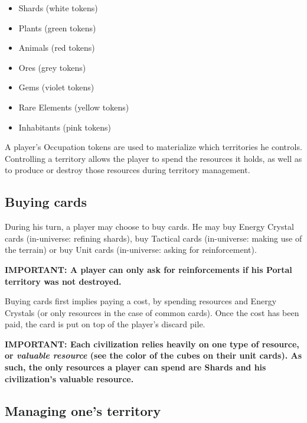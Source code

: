 \documentclass[a4paper]{article}
\begin{document}
    \vspace{-1.3em}
    \begin{itemize}
        \item Shards (white tokens)
        \item Plants (green tokens)
        \item Animals (red tokens)
        \item Ores (grey tokens)
        \item Gems (violet tokens)
        \item Rare Elements (yellow tokens)
        \item Inhabitants (pink tokens)
    \end{itemize}
    
    \vspace{-0.7em}
    A player's Occupation tokens are used to materialize which territories he controls.
    Controlling a territory allows the player to spend the resources it holds,
    as well as to produce or destroy those resources during territory management.
  
  
  \subsection{Buying cards}

    During his turn, a player may choose to buy cards.
    He may buy Energy Crystal cards (in-universe: refining shards),
    buy Tactical cards (in-universe: making use of the terrain)
    or buy Unit cards (in-universe: asking for reinforcement).
    
    \hspace{-1.5em} \textbf{IMPORTANT:
    A player can only ask for reinforcements if his Portal territory was not destroyed.
    }
    
    Buying cards first implies paying a cost, by spending resources and Energy Crystals
    (or only resources in the case of common cards).
    Once the cost has been paid, the card is put on top of the player's discard pile.
    
    \hspace{-1.5em} \textbf{IMPORTANT:
    Each civilization relies heavily on one type of resource, or
    \textit{valuable resource} (see the color of the cubes on their unit cards).
    As such, the only resources a player can spend are Shards and his civilization's
    valuable resource.
    }


\newpage
  \subsection{Managing one's territory}
  
\end{document}
